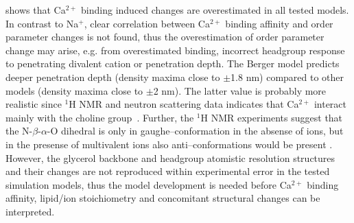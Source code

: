 \documentclass[pre,aps,floatfix,authordate1-4,twocolumn]{revtex4-1}
\begin{document}
shows that Ca$^{2+}$ binding induced changes are overestimated in all tested models.
In contrast to Na$^+$, clear correlation between Ca$^{2+}$ binding affinity and order parameter changes is not found, 
thus the overestimation of order parameter change may arise, e.g. from overestimated binding, 
incorrect headgroup response to penetrating divalent cation or penetration depth. 
The Berger model predicts deeper penetration depth (density maxima close to $\pm$1.8 nm) compared
to other models (density maxima close to $\pm$2 nm). The latter value is probably more realistic 
since $^1$H NMR and neutron scattering data indicates that Ca$^{2+}$ interact mainly with the 
choline group~\cite{hauser76,hauser78,herbette84,cevc90}.
Further, the $^1$H NMR experiments suggest that the N-$\beta$-$\alpha$-O dihedral is only in 
gaughe--conformation in the absense of ions, but in the presense of multivalent ions also anti--conformations
would be present \cite{hauser78, hauser81}. However, the glycerol backbone and headgroup atomistic resolution structures~\cite{botan15}
and their changes are not reproduced within experimental error in the tested simulation models,
thus the model development is needed before Ca$^{2+}$ binding affinity, lipid/ion stoichiometry 
and concomitant structural changes can be interpreted.
\end{document}
